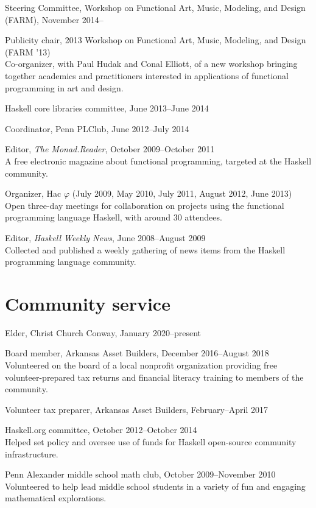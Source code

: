 \documentclass[12pt]{article}
\newcommand{\cvitem}{\par\hangpara{2em}{1}}
\begin{document}
\cvitem Steering Committee, Workshop on Functional Art, Music,
Modeling, and Design (FARM), November 2014--

\cvitem Publicity chair, 2013 Workshop on Functional Art, Music,
  Modeling, and Design (FARM '13) \\
  Co-organizer, with Paul Hudak and Conal Elliott, of a new workshop
  bringing together academics and practitioners interested in
  applications of functional programming in art and design.

\cvitem Haskell core libraries committee, June 2013--June 2014

\cvitem Coordinator, Penn PLClub, June 2012--July 2014

\cvitem Editor, \emph{The Monad.Reader}, October 2009--October 2011 \\
A free electronic magazine about functional programming, targeted at
the Haskell community.

\cvitem Organizer, Hac $\varphi$ (July 2009, May 2010, July 2011,
August 2012, June 2013) \\
Open three-day meetings for collaboration on projects using the functional
programming language Haskell, with around 30 attendees.

\cvitem Editor, \emph{Haskell Weekly News}, June 2008--August 2009 \\
Collected and published a weekly gathering of news items from the
Haskell programming language community.

\section*{Community service}

\cvitem Elder, Christ Church Conway, January 2020--present

\cvitem Board member, Arkansas Asset Builders, December
2016--August 2018 \\
Volunteered on the board of a local nonprofit organization providing
free volunteer-prepared tax returns and financial literacy training to
members of the community.

\cvitem Volunteer tax preparer, Arkansas Asset Builders,
February--April 2017

\cvitem Haskell.org committee, October 2012--October 2014 \\
Helped set policy and oversee use of funds for Haskell open-source
community infrastructure.

\cvitem Penn Alexander middle school math club, October 2009--November
2010 \\
Volunteered to help lead middle school students in a variety of fun
and engaging mathematical explorations.
\end{document}
